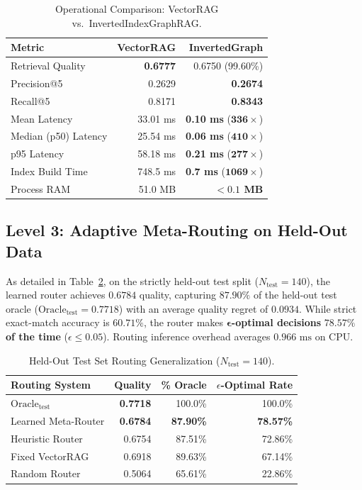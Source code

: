 \documentclass[10pt,twocolumn,letterpaper]{article}
\begin{document}
\begin{table}[h]
\centering
\small
\caption{Operational Comparison: VectorRAG vs.~InvertedIndexGraphRAG.}
\label{tab:pareto}
\begin{tabular}{lrr}
\toprule
\textbf{Metric} & \textbf{VectorRAG} & \textbf{InvertedGraph} \\
\midrule
Retrieval Quality & \textbf{0.6777} & 0.6750 (99.60\%) \\
Precision@5 & 0.2629 & \textbf{0.2674} \\
Recall@5 & 0.8171 & \textbf{0.8343} \\
Mean Latency & 33.01 ms & \textbf{0.10 ms} ($\mathbf{336\times}$) \\
Median (p50) Latency & 25.54 ms & \textbf{0.06 ms} ($\mathbf{410\times}$) \\
p95 Latency & 58.18 ms & \textbf{0.21 ms} ($\mathbf{277\times}$) \\
Index Build Time & 748.5 ms & \textbf{0.7 ms} ($\mathbf{1069\times}$) \\
Process RAM & 51.0 MB & \textbf{$<0.1$ MB} \\
\bottomrule
\end{tabular}
\end{table}

\subsection{Level 3: Adaptive Meta-Routing on Held-Out Data}
As detailed in Table~\ref{tab:router}, on the strictly held-out test split ($N_{\text{test}} = 140$), the learned router achieves $0.6784$ quality, capturing $\mathbf{87.90\%}$ of the held-out test oracle ($\text{Oracle}_{\text{test}} = 0.7718$) with an average quality regret of $0.0934$. While strict exact-match accuracy is $60.71\%$, the router makes $\mathbf{\epsilon}$\textbf{-optimal decisions} $\mathbf{78.57\%}$ \textbf{of the time} ($\epsilon \le 0.05$). Routing inference overhead averages $0.966\text{ ms}$ on CPU.

\begin{table}[h]
\centering
\small
\caption{Held-Out Test Set Routing Generalization ($N_{\text{test}}=140$).}
\label{tab:router}
\begin{tabular}{lrrr}
\toprule
\textbf{Routing System} & \textbf{Quality} & \textbf{\% Oracle} & \textbf{$\epsilon$-Optimal Rate} \\
\midrule
$\text{Oracle}_{\text{test}}$ & \textbf{0.7718} & 100.0\% & 100.0\% \\
Learned Meta-Router & \textbf{0.6784} & \textbf{87.90\%} & \textbf{78.57\%} \\
Heuristic Router & 0.6754 & 87.51\% & 72.86\% \\
Fixed VectorRAG & 0.6918 & 89.63\% & 67.14\% \\
Random Router & 0.5064 & 65.61\% & 22.86\% \\
\bottomrule
\end{tabular}
\end{table}
\end{document}

